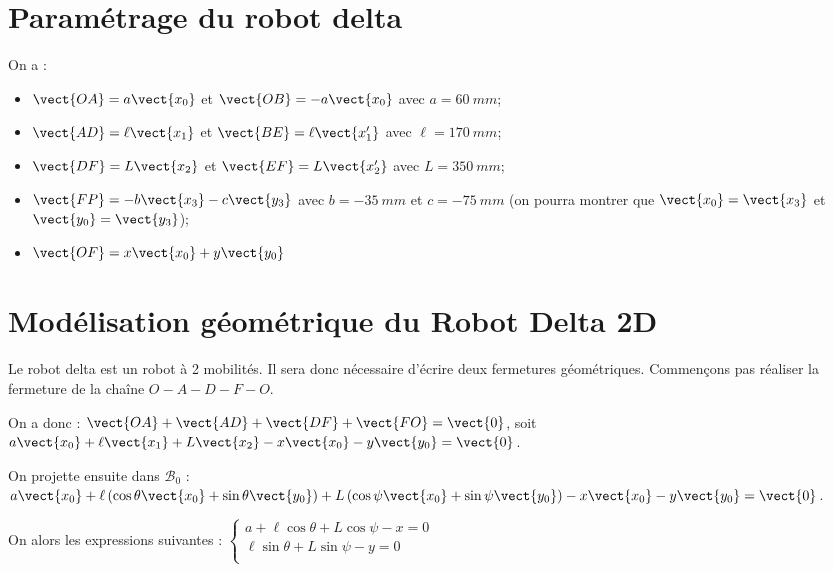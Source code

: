 \documentclass[10pt,fleqn]{article} %
\begin{document}
\graphicspath{{../../../style/png/}{images/}}






\section{Paramétrage du robot delta}

On a  :
\begin{itemize}
\item $\vect{OA} = a\vect{x_0}$ et $\vect{OB} =- a\vect{x_0}$  avec $a =\SI{60}{mm}$;
\item $\vect{AD} = \ell\vect{x_1}$ et $\vect{BE} = \ell\vect{x_1'}$ avec $\ell =\SI{170}{mm}$;
\item $\vect{DF} =  L\vect{x_2}$ et $\vect{EF} = L\vect{x_2'}$ avec $L=\SI{350}{mm}$;
\item $\vect{FP}=-b\vect{x_3}-c\vect{y_3}$ avec $b=-\SI{35}{mm}$ et $c=-\SI{75}{mm}$ 
(on pourra montrer que $\vect{x_0}=\vect{x_3}$ et $\vect{y_0}=\vect{y_3}$);
\item $\vect{OF} = x\vect{x_0} +y\vect{y_0} $
\end{itemize}

\section{Modélisation géométrique du Robot Delta 2D}

Le robot delta est un robot à 2 mobilités. Il sera donc nécessaire d'écrire deux fermetures géométriques. 
Commençons pas réaliser la fermeture de la chaîne $O - A - D - F - O$. 

On a donc : 
$\vect{OA}+\vect{AD}+\vect{DF}+\vect{FO} = \vect{0}$, soit 
$a\vect{x_0}+ \ell\vect{x_1}+L\vect{x_2} -x\vect{x_0} -y\vect{y_0} = \vect{0}$.

On projette ensuite dans $\mathcal{B}_{0}$ :
$a\vect{x_0}+ \ell \left( \cos\theta \vect{x_0} + \sin\theta \vect{y_0} \right)+L\left( \cos\psi \vect{x_0} + \sin\psi\vect{y_0} \right) -x\vect{x_0} -y\vect{y_0} = \vect{0}$. 

On alors les expressions suivantes :
$
\left\{
\begin{array}{l}
a+ \ell  \cos\theta +L \cos\psi -x  = 0 \\
\ell   \sin\theta+L\sin\psi -y = 0 \\
\end{array}
\right.
$
\end{document}
